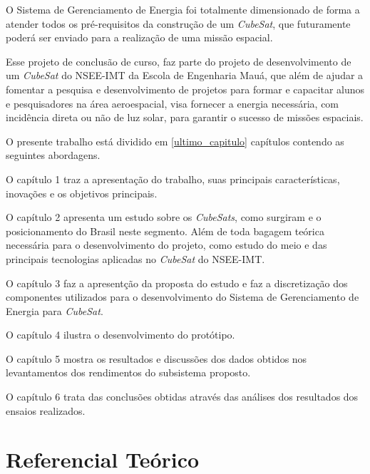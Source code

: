 \documentclass[
	12pt,				%
	openright,			%
	oneside,			%
	a4paper,			%
	english,			%
	french,				%
	spanish,			%
	brazil,				%
	oldfontcommands
	]{abntex2}
\begin{document}
	O Sistema de Gerenciamento de Energia foi totalmente dimensionado de forma a atender todos os pré-requisitos da construção de um \textit{CubeSat}, que futuramente poderá ser enviado para a realização de uma missão espacial.


	Esse projeto de conclusão de curso, faz parte do projeto de desenvolvimento de um \textit{CubeSat} do NSEE-IMT da Escola de Engenharia Mauá, que além de ajudar a fomentar a pesquisa e desenvolvimento de projetos para formar e capacitar alunos e pesquisadores na área aeroespacial, visa fornecer a energia necessária, com incidência direta ou não de luz solar, para garantir o sucesso de missões espaciais.
	
	O presente trabalho está dividido em \ref{ultimo_capitulo} capítulos contendo as seguintes abordagens.

	O capítulo 1 traz a apresentação do trabalho, suas principais características, inovações e os objetivos principais.

	O capítulo 2 apresenta um estudo sobre os \textit{CubeSats}, como surgiram e o posicionamento do Brasil neste segmento. Além de toda bagagem teórica necessária para o desenvolvimento do projeto, como estudo do meio e das principais tecnologias aplicadas no \textit{CubeSat} do NSEE-IMT.

	O capítulo 3 faz a apresentção da proposta do estudo e faz a discretização dos componentes utilizados para o desenvolvimento do Sistema de Gerenciamento de Energia para \textit{CubeSat}.

	O capítulo 4 ilustra o desenvolvimento do protótipo.	
	
	O capítulo 5 mostra os resultados e discussões dos dados obtidos nos levantamentos dos rendimentos do subsistema proposto.

	O capítulo 6 trata das conclusões obtidas através das análises dos resultados dos ensaios realizados. 

\chapter[Referencial Teórico]{Referencial Teórico} \label{Cap_Teorico}
\end{document}
